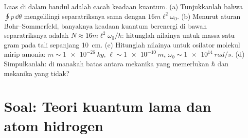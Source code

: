 \begin{exercise}[$\star\star\star$]\label{exo:b3:hamiltonian-mechanics:12}
Luas di dalam  bandul adalah cacah keadaan kuantum. (a)
Tunjukkanlah bahwa $\oint p\,\dd\theta$ mengelilingi separatriksnya sama
dengan $16m\ell^2\omega_0$. (b) Menurut aturan Bohr--Sommerfeld,
banyaknya keadaan kuantum berenergi di bawah separatriksnya adalah $N \approx
16m\ell^2\omega_0/h$: hitunglah nilainya untuk massa satu gram pada tali
sepanjang \qty{10}{cm}. (c) Hitunglah nilainya untuk osilator molekul
mirip amonia: $m \sim \qty{1e-26}{kg}$, $\ell \sim \qty{1e-10}{m}$,
$\omega_0 \sim \qty{1e14}{rad/s}$. (d) Simpulkanlah: di manakah batas
antara mekanika yang memerlukan $\hbar$ dan mekanika yang tidak?
\end{exercise}

\section{Soal: Teori kuantum lama dan atom hidrogen}

